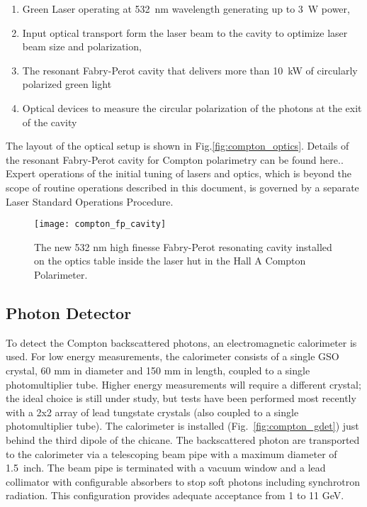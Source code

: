 {\begin{enumerate}
\item Green Laser operating at 532~nm wavelength generating up to 3~W power,
\item Input optical transport  form the laser beam to the cavity to optimize laser beam size and polarization,
\item The resonant Fabry-Perot cavity that delivers more than 10~kW of circularly polarized green light
\item Optical devices to measure the circular polarization of the photons at the exit of the cavity
\end{enumerate}


The layout of the optical setup is shown in Fig.\ref{fig:compton_optics}.
Details of the resonant Fabry-Perot cavity for
Compton polarimetry can be found here.\cite{compton_IR_cavity_pub}.
 Expert operations of the initial tuning of lasers and optics, which is beyond the scope of routine operations described in this document,  is governed by a separate Laser Standard Operations Procedure\cite{compton_LSOP}.

\begin{figure}[htp]
    \begin{center}
        \texttt{[image: compton\_fp\_cavity]}
    \end{center}
    \caption[compton:FP Cavity]{
            The new 532 nm high finesse Fabry-Perot resonating cavity installed on the optics table inside the laser hut in the Hall A Compton Polarimeter.
            }
    \label{fig:compton_cavity}
 \end{figure}

\subsection{Photon Detector}
To detect the Compton backscattered photons, an electromagnetic calorimeter is used. For low energy measurements, the calorimeter
consists of a single GSO crystal, 60 mm in diameter and 150 mm in length, coupled to a single photomultiplier tube. Higher energy
measurements will require a different crystal; the ideal choice is still under study, but tests have been performed most recently
with a 2x2 array of lead tungstate crystals (also coupled to a single photomultiplier tube). The calorimeter is installed
(Fig.~\ref{fig:compton_gdet})  just behind the third  dipole of the chicane. The backscattered photon are transported to the
calorimeter via a telescoping  beam pipe with a maximum diameter of  1.5~inch. The beam pipe is terminated with a vacuum window and
a lead collimator with configurable absorbers to stop soft photons including synchrotron radiation. This configuration
provides adequate acceptance from  1 to 11 GeV.  

}
